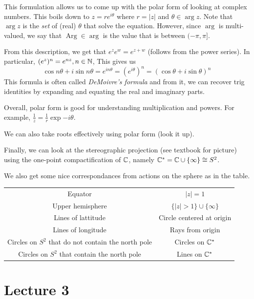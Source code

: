 \documentclass[11pt,leqno,oneside]{amsart}
\newcommand{\Arg}{\operatorname{Arg}}
\begin{document}
This formulation allows us to come up with the polar form of looking at complex
numbers. This boils down to $z = r e^{i \theta}$ where $r = |z|$ and $\theta
\in \arg z$. Note that $\arg z$ is the \emph{set} of (real) $\theta$ that solve
the equation. However, since $\arg$ is multi-valued, we say that $\Arg \in
\arg$ is the value that is between $(-\pi, \pi]$.

From this description, we get that $e^z e^w = e^{z+w}$ (follows from the power series). In particular, $(e^z)^n = e^{nz}, n \in {\mathbb N}$, This gives us \[
    \cos n \theta + i \sin n \theta = e^{in\theta} = (e^{i\theta})^n = (\cos \theta + i \sin \theta)^n
\]
This formula is often called \emph{DeMoivre's formula} and from it, we can
recover trig identities by expanding and equating the real and imaginary parts.

Overall, polar form is good for understanding multiplication and powers. For example, $\frac{1}{z} = \frac{1}{r} \exp{-i \theta}$.

We can also take roots effectively using polar form (look it up).

Finally, we can look at the stereographic projection (see textbook for picture) using the one-point compactification of ${\mathbb C}$, namely ${\mathbb C}^* = {\mathbb C} \cup \{\infty\} \cong S^2$.

We also get some nice correspondances from actions on the sphere as in the table. \\
    \begin{tabular}{|c|c|}
        \hline
        Equator & $|z| = 1$ \\
        Upper hemisphere & $\{|z| > 1\} \cup \{\infty\}$ \\
        Lines of lattitude & Circle centered at origin \\
        Lines of longitude & Rays from origin \\
        Circles on $S^2$ that do not contain the north pole & Circles on ${\mathbb C}^*$ \\
        Circles on $S^2$ that contain the north pole & Lines on ${\mathbb C}^*$ \\
        \hline
    \end{tabular}
\section{Lecture 3}
\end{document}
